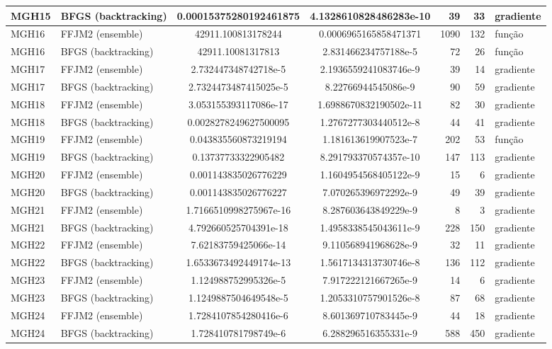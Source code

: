 \documentclass[11pt]{article}
\begin{document}
\begin{longtable}{l l S[table-format=1.3e2] S[table-format=1.3e2] r r l}
MGH15 & BFGS (backtracking) & 0.00015375280192461875 & 4.1328610828486283e-10 & 39 & 33 & gradiente \\
\midrule
MGH16 & FFJM2 (ensemble) & 42911.100813178244 & 0.0006965165858471371 & 1090 & 132 & fun\c{c}\~ao \\
MGH16 & BFGS (backtracking) & 42911.10081317813 & 2.831466234757188e-5 & 72 & 26 & fun\c{c}\~ao \\
\midrule
MGH17 & FFJM2 (ensemble) & 2.732447348742718e-5 & 2.1936559241083746e-9 & 39 & 14 & gradiente \\
MGH17 & BFGS (backtracking) & 2.7324473487415025e-5 & 8.22766944545086e-9 & 90 & 59 & gradiente \\
\midrule
MGH18 & FFJM2 (ensemble) & 3.053155393117086e-17 & 1.6988670832190502e-11 & 82 & 30 & gradiente \\
MGH18 & BFGS (backtracking) & 0.0028278249627500095 & 1.2767277303440512e-8 & 44 & 41 & gradiente \\
\midrule
MGH19 & FFJM2 (ensemble) & 0.043835560873219194 & 1.181613619907523e-7 & 202 & 53 & fun\c{c}\~ao \\
MGH19 & BFGS (backtracking) & 0.13737733322905482 & 8.291793370574357e-10 & 147 & 113 & gradiente \\
\midrule
MGH20 & FFJM2 (ensemble) & 0.001143835026776229 & 1.1604954568405122e-9 & 15 & 6 & gradiente \\
MGH20 & BFGS (backtracking) & 0.001143835026776227 & 7.070265396972292e-9 & 49 & 39 & gradiente \\
\midrule
MGH21 & FFJM2 (ensemble) & 1.7166510998275967e-16 & 8.287603643849229e-9 & 8 & 3 & gradiente \\
MGH21 & BFGS (backtracking) & 4.792660525704391e-18 & 1.4958338545043611e-9 & 228 & 150 & gradiente \\
\midrule
MGH22 & FFJM2 (ensemble) & 7.62183759425066e-14 & 9.110568941968628e-9 & 32 & 11 & gradiente \\
MGH22 & BFGS (backtracking) & 1.6533673492449174e-13 & 1.5617134313730746e-8 & 136 & 112 & gradiente \\
\midrule
MGH23 & FFJM2 (ensemble) & 1.124988752995326e-5 & 7.917222121667265e-9 & 14 & 6 & gradiente \\
MGH23 & BFGS (backtracking) & 1.1249887504649548e-5 & 1.2053310757901526e-8 & 87 & 68 & gradiente \\
\midrule
MGH24 & FFJM2 (ensemble) & 1.7284107854280416e-6 & 8.601369710783445e-9 & 44 & 18 & gradiente \\
MGH24 & BFGS (backtracking) & 1.728410781798749e-6 & 6.288296516355331e-9 & 588 & 450 & gradiente \\

\end{longtable}
\end{document}
